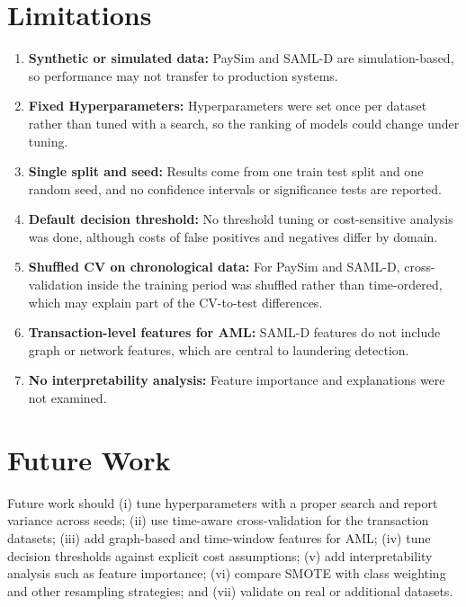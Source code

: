 \documentclass[10pt,twocolumn,a4paper]{article}
\begin{document}
\section{Limitations}
\begin{enumerate}
\item \textbf{Synthetic or simulated data:} PaySim and SAML-D are simulation-based, so performance may not transfer to production systems.
\item \textbf{Fixed Hyperparameters:} Hyperparameters were set once per dataset rather than tuned with a search, so the ranking of models could change under tuning.
\item \textbf{Single split and seed:} Results come from one train test split and one random seed, and no confidence intervals or significance tests are reported.
\item \textbf{Default decision threshold:} No threshold tuning or cost-sensitive analysis was done, although costs of false positives and negatives differ by domain.
\item \textbf{Shuffled CV on chronological data:} For PaySim and SAML-D, cross-validation inside the training period was shuffled rather than time-ordered, which may explain part of the CV-to-test differences.
\item \textbf{Transaction-level features for AML:} SAML-D features do not include graph or network features, which are central to laundering detection.
\item \textbf{No interpretability analysis:} Feature importance and explanations were not examined.
\end{enumerate}
\section{Future Work}
Future work should (i) tune hyperparameters with a proper search and report variance across seeds; (ii) use time-aware cross-validation for the transaction datasets; (iii) add graph-based and time-window features for AML; (iv) tune decision thresholds against explicit cost assumptions; (v) add interpretability analysis such as feature importance; (vi) compare SMOTE with class weighting and other resampling strategies; and (vii) validate on real or additional datasets.

\end{document}

